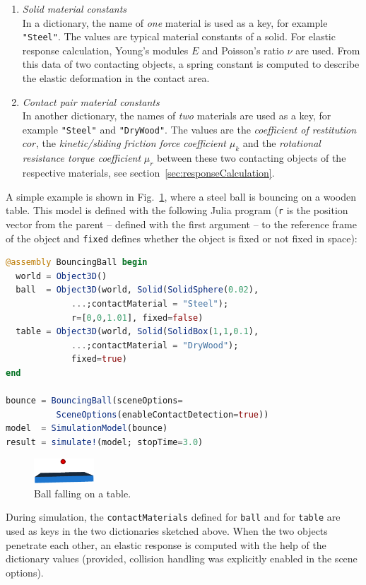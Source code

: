 \begin{enumerate}
\item \emph{Solid material constants}\\
      In a dictionary, the name of \emph{one} material is used as a key, for example \texttt{"Steel"}. 
      The values are typical material constants of a solid. For elastic response calculation,
      Young's modules $E$ and Poisson's ratio $\nu$ are used. From this data of two contacting
      objects, a spring constant is computed to describe the elastic deformation in the contact area.

\item \emph{Contact pair material constants}\\
      In another dictionary, the names of \emph{two} materials are used as a key, for example \texttt{"Steel"} 
      and \texttt{"DryWood"}. The values are the \emph{coefficient of restitution} $cor$, 
      the \emph{kinetic/sliding friction force coefficient} $\mu_k$ and the 
      \emph{rotational resistance torque coefficient} $\mu_r$ between these two contacting
      objects of the respective materials, see section~\ref{sec:responseCalculation}.
\end{enumerate}  

A simple example is shown in Fig.~\ref{fig:bouncingBall}, where a
steel ball is bouncing on a wooden table.
This model is defined with the following Julia program
(\texttt{r} is the position vector from the parent -- defined with the first
argument -- to the reference frame of the object and \texttt{fixed} defines
whether the object is fixed or not fixed in space):
%
\begin{lstlisting}[language = Julia]
@assembly BouncingBall begin
  world = Object3D()
  ball  = Object3D(world, Solid(SolidSphere(0.02),
		     ...;contactMaterial = "Steel");
		     r=[0,0,1.01], fixed=false)
  table = Object3D(world, Solid(SolidBox(1,1,0.1),
		     ...;contactMaterial = "DryWood"); 
		     fixed=true)
end

bounce = BouncingBall(sceneOptions=
          SceneOptions(enableContactDetection=true))
model  = SimulationModel(bounce)
result = simulate!(model; stopTime=3.0)
\end{lstlisting}

%
\begin{figure}[htb]
	\centering
	\includegraphics[width=0.2\textwidth]{figures/bouncingBall.png}
	\caption{Ball falling on a table.}
	\label{fig:bouncingBall}
\end{figure}
%
During simulation, the \texttt{contactMaterials} defined for
\texttt{ball} and for \texttt{table} are used as keys in the two
dictionaries sketched above. 
When the two objects penetrate each other,
an elastic response is computed with the help of the dictionary values 
(provided, collision handling was explicitly enabled in the scene options).

